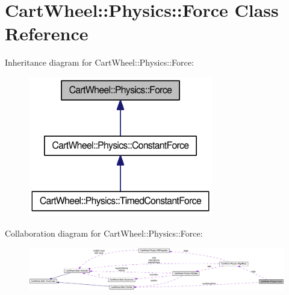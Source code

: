 \hypertarget{classCartWheel_1_1Physics_1_1Force}{
\section{CartWheel::Physics::Force Class Reference}
\label{classCartWheel_1_1Physics_1_1Force}
}


Inheritance diagram for CartWheel::Physics::Force:\nopagebreak
\begin{figure}[H]
\begin{center}
\leavevmode
\includegraphics[width=228pt]{classCartWheel_1_1Physics_1_1Force__inherit__graph}
\end{center}
\end{figure}


Collaboration diagram for CartWheel::Physics::Force:\nopagebreak
\begin{figure}[H]
\begin{center}
\leavevmode
\includegraphics[width=400pt]{classCartWheel_1_1Physics_1_1Force__coll__graph}
\end{center}
\end{figure}
